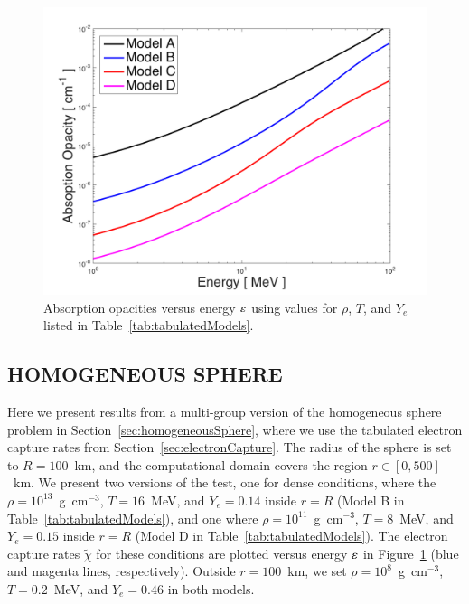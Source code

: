 \documentclass[11pt,letterpaper,twoside,english,final]{article}
\begin{document}
\begin{figure}[h]
  \centering
  \includegraphics[scale=0.8]{./Figures/HomogeneousSphere_Opacities}
  \vspace{-0.1in}
  \caption{Absorption opacities versus energy $\varepsilon$ using values for $\rho$, $T$, and $Y_{e}$ listed in Table~\ref{tab:tabulatedModels}.}
  \label{fig:absorptionOpacities_weaklib}
\end{figure}

\subsection{HOMOGENEOUS SPHERE}
\label{sec:homogeneousSphereTable}

Here we present results from a multi-group version of the homogeneous sphere problem in Section~\ref{sec:homogeneousSphere}, where we use the tabulated electron capture rates from Section~\ref{sec:electronCapture}.  
The radius of the sphere is set to $R=100$~km, and the computational domain covers the region $r\in[0,500]$~km.  
We present two versions of the test, one for dense conditions, where the $\rho=10^{13}$~g~cm$^{-3}$, $T=16$~MeV, and $Y_{e}=0.14$ inside $r=R$ (Model B in Table~\ref{tab:tabulatedModels}), and one where $\rho=10^{11}$~g~cm$^{-3}$, $T=8$~MeV, and $Y_{e}=0.15$ inside $r=R$ (Model D in Table~\ref{tab:tabulatedModels}).  
The electron capture rates $\tilde{\chi}$ for these conditions are plotted versus energy $\varepsilon$ in Figure~\ref{fig:absorptionOpacities_weaklib} (blue and magenta lines, respectively).  
Outside $r=100$~km, we set $\rho=10^{8}$~g~cm$^{-3}$, $T=0.2$~MeV, and $Y_{e}=0.46$ in both models.  
\end{document}
